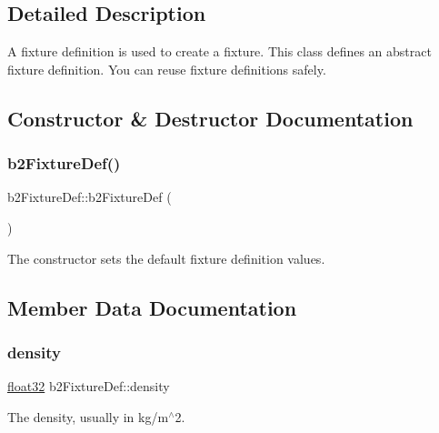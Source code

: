 \subsection{Detailed Description}
A fixture definition is used to create a fixture. This class defines an abstract fixture definition. You can reuse fixture definitions safely. 

\subsection{Constructor \& Destructor Documentation}
\mbox{\label{structb2_fixture_def_aa34ba06bcf0d6d981931a83cf124a602}} 
\subsubsection{\texorpdfstring{b2FixtureDef()}{b2FixtureDef()}}
{\footnotesize\ttfamily b2\+Fixture\+Def\+::b2\+Fixture\+Def (\begin{DoxyParamCaption}{ }\end{DoxyParamCaption})\hspace{0.3cm}{\ttfamily [inline]}}



The constructor sets the default fixture definition values. 



\subsection{Member Data Documentation}
\mbox{\label{structb2_fixture_def_a6e27d733789a35aa689af2b30a1de0ff}} 
\subsubsection{\texorpdfstring{density}{density}}
{\footnotesize\ttfamily \mbox{\hyperlink{b2_settings_8h_aacdc525d6f7bddb3ae95d5c311bd06a1}{float32}} b2\+Fixture\+Def\+::density}



The density, usually in kg/m$^\wedge$2. 

\mbox{\label{structb2_fixture_def_a4c3e493a13d11ab27fcc2eee9f52fd61}} 
